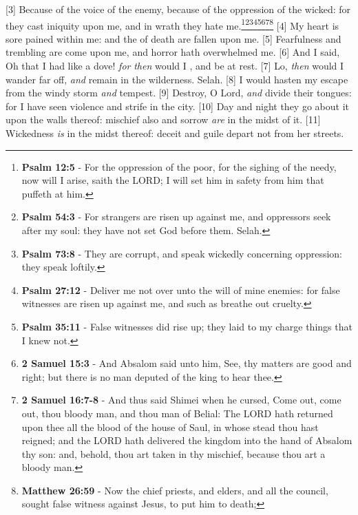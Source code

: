 [3] \textcolor[cmyk]{0.99998,1,0,0}{Because of the voice of the enemy, because of the oppression of the wicked: for they cast iniquity upon me, and in wrath they hate me.}\footnote{\textbf{Psalm 12:5} - For the oppression of the poor, for the sighing of the needy, now will I arise, saith the LORD; I will set him in safety from him that puffeth at him.}\footnote{\textbf{Psalm 54:3} - For strangers are risen up against me, and oppressors seek after my soul: they have not set God before them. Selah.}\footnote{\textbf{Psalm 73:8} - They are corrupt, and speak wickedly concerning oppression: they speak loftily.}\footnote{\textbf{Psalm 27:12} - Deliver me not over unto the will of mine enemies: for false witnesses are risen up against me, and such as breathe out cruelty.}\footnote{\textbf{Psalm 35:11} - False witnesses did rise up; they laid to my charge things that I knew not.}\footnote{\textbf{2 Samuel 15:3} - And Absalom said unto him, See, thy matters are good and right; but there is no man deputed of the king to hear thee.}\footnote{\textbf{2 Samuel 16:7-8} - And thus said Shimei when he cursed, Come out, come out, thou bloody man, and thou man of Belial: The LORD hath returned upon thee all the blood of the house of Saul, in whose stead thou hast reigned; and the LORD hath delivered the kingdom into the hand of Absalom thy son: and, behold, thou art taken in thy mischief, because thou art a bloody man.}\footnote{\textbf{Matthew 26:59} - Now the chief priests, and elders, and all the council, sought false witness against Jesus, to put him to death;}
[4] \textcolor[cmyk]{0.99998,1,0,0}{My heart is sore pained within me: and the  of death are fallen upon me.}
[5] \textcolor[cmyk]{0.99998,1,0,0}{Fearfulness and trembling are come upon me, and horror hath overwhelmed me.}
[6] \textcolor[cmyk]{0.99998,1,0,0}{And I said, Oh that I had  like a dove! \emph{for} \emph{then} would I , and be at rest.}
[7] \textcolor[cmyk]{0.99998,1,0,0}{Lo, \emph{then} would I wander far off, \emph{and} remain in the wilderness. Selah.}
[8] \textcolor[cmyk]{0.99998,1,0,0}{I would hasten my escape from the windy storm \emph{and} tempest.}
[9] \textcolor[cmyk]{0.99998,1,0,0}{Destroy, O Lord, \emph{and} divide their tongues: for I have seen violence and strife in the city.}
[10] \textcolor[cmyk]{0.99998,1,0,0}{Day and night they go about it upon the walls thereof: mischief also and sorrow \emph{are} in the midst of it.}
[11] \textcolor[cmyk]{0.99998,1,0,0}{Wickedness \emph{is} in the midst thereof: deceit and guile depart not from her streets.}
